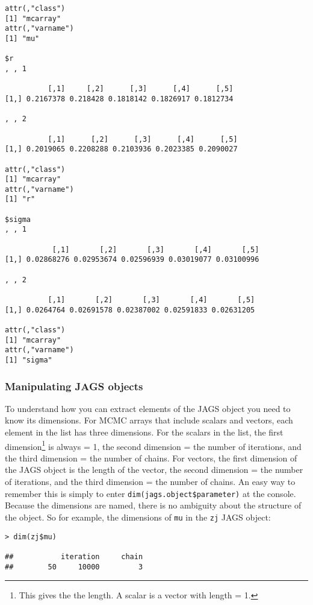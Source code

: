 \documentclass[12pt,english]{article}
\begin{document}
{\begin{multicols}{2}
\begin{Verbatim}[fontsize=\tiny]
attr(,"class")
[1] "mcarray"
attr(,"varname")
[1] "mu"

$r
, , 1

          [,1]     [,2]      [,3]      [,4]      [,5]
[1,] 0.2167378 0.218428 0.1818142 0.1826917 0.1812734

, , 2

          [,1]      [,2]      [,3]      [,4]      [,5]
[1,] 0.2019065 0.2208288 0.2103936 0.2023385 0.2090027

attr(,"class")
[1] "mcarray"
attr(,"varname")
[1] "r"

$sigma
, , 1

           [,1]       [,2]       [,3]       [,4]       [,5]
[1,] 0.02868276 0.02953674 0.02596939 0.03019077 0.03100996

, , 2

          [,1]       [,2]       [,3]       [,4]       [,5]
[1,] 0.0264764 0.02691578 0.02387002 0.02591833 0.02631205

attr(,"class")
[1] "mcarray"
attr(,"varname")
[1] "sigma"
\end{Verbatim}
\end{multicols}

\subsubsection{Manipulating JAGS objects}

To understand how you can extract elements of the JAGS object you need to know its dimensions. For MCMC arrays that include scalars and vectors, each element in the list has three dimensions. For the scalars in the list, the first dimension\footnote{This gives the the length. A scalar is a vector with length = 1.} is always = 1, the second dimension = the number of iterations, and the third dimension = the number of chains. For vectors, the first dimension of the JAGS object is the length of the vector, the second dimension = the number of iterations, and the third dimension = the number of chains. An easy way to remember this is simply to enter \texttt{dim(jags.object\$parameter)} at the console. Because the dimensions are named, there is no ambiguity about the structure of the object. So for example, the dimensions of \texttt{mu} in the \texttt{zj} JAGS object: 

\begin{Verbatim}
> dim(zj$mu)

##           iteration     chain 
##        50     10000         3
\end{Verbatim}

}
\end{document}
